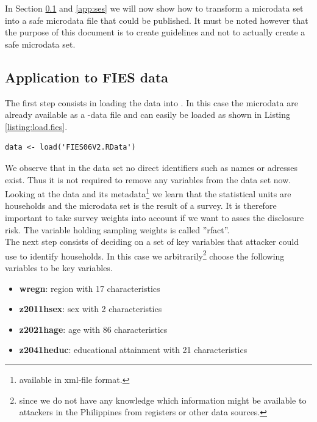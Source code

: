 \documentclass[12pt]{article}
\begin{document}
In Section \ref{app:fies} and \ref{app:ses} we will now show how 
to transform a microdata set into a safe microdata file that could be published. 
It must be noted however that the purpose of this document is to create guidelines and not 
to actually create a safe microdata set.

\subsection{Application to FIES data}\label{app:fies} 


The first step consists in loading the data into \R. In this case 
the microdata are already available as a \R-data file and can easily be 
loaded as shown in Listing \ref{listing:load.fies}.

\begin{lstlisting}[captionpos=b, caption={Loading microdata into \R.}, label=listing:load.fies]
data <- load('FIES06V2.RData')
\end{lstlisting}

We observe that in the data set no direct identifiers such as names or adresses
exist. Thus it is not required to remove any variables from the data set now. Looking at the data and its metadata\footnote{available in xml-file format.} we learn that the statistical units are households and the microdata set is the result of a survey. It is therefore important to take survey weights into account if we want to asses the disclosure risk. The variable holding sampling weights is called ''rfact''. \\

The next step consists of deciding on a set of key variables that attacker could use to identify households. In this case we 
arbitrarily\footnote{since we do not have any knowledge which information might be available to attackers in the Philippines 
from registers or other data sources.} choose the following variables to be key variables.
\begin{itemize}
	\item {\bf w\textunderscore regn}: region with 17 characteristics
	\item {\bf z2011\textunderscore h\textunderscore sex}: sex with 2 characteristics
	\item {\bf z2021\textunderscore h\textunderscore age}: age with 86 characteristics
	\item {\bf z2041\textunderscore h\textunderscore educ}: educational attainment with 21 characteristics
\end{itemize}
\end{document}

